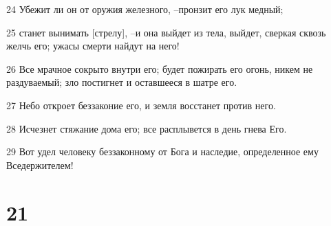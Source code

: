 \par 24 Убежит ли он от оружия железного, --пронзит его лук медный;
\par 25 станет вынимать [стрелу], --и она выйдет из тела, выйдет, сверкая сквозь желчь его; ужасы смерти найдут на него!
\par 26 Все мрачное сокрыто внутри его; будет пожирать его огонь, никем не раздуваемый; зло постигнет и оставшееся в шатре его.
\par 27 Небо откроет беззаконие его, и земля восстанет против него.
\par 28 Исчезнет стяжание дома его; все расплывется в день гнева Его.
\par 29 Вот удел человеку беззаконному от Бога и наследие, определенное ему Вседержителем!

\chapter{21}

